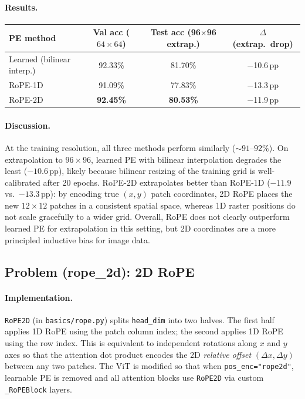 \documentclass[11pt]{article}
\begin{document}
\paragraph{Results.}

\begin{center}
\begin{tabular}{lccc}
\toprule
PE method & Val acc ($64{\times}64$) & Test acc (96$\times$96 extrap.) & $\Delta$ (extrap.\ drop) \\
\midrule
Learned (bilinear interp.) & 92.33\% & 81.70\% & $-$10.6\,pp \\
RoPE-1D                    & 91.09\% & 77.83\% & $-$13.3\,pp \\
RoPE-2D                    & \textbf{92.45\%} & \textbf{80.53\%} & $-$11.9\,pp \\
\bottomrule
\end{tabular}
\end{center}

\paragraph{Discussion.}
At the training resolution, all three methods perform similarly (${\sim}91$--$92\%$). On extrapolation to $96{\times}96$, learned PE with bilinear interpolation degrades the least ($-10.6$\,pp), likely because bilinear resizing of the training grid is well-calibrated after 20 epochs. RoPE-2D extrapolates better than RoPE-1D ($-11.9$ vs.\ $-13.3$\,pp): by encoding true $(x,y)$ patch coordinates, 2D RoPE places the new $12{\times}12$ patches in a consistent spatial space, whereas 1D raster positions do not scale gracefully to a wider grid. Overall, RoPE does not clearly outperform learned PE for extrapolation in this setting, but 2D coordinates are a more principled inductive bias for image data.

\subsection*{Problem (rope\_2d): 2D RoPE}

\paragraph{Implementation.}
\texttt{RoPE2D} (in \texttt{basics/rope.py}) splits \texttt{head\_dim} into two halves. The first half applies 1D RoPE using the patch column index; the second applies 1D RoPE using the row index. This is equivalent to independent rotations along $x$ and $y$ axes so that the attention dot product encodes the 2D \emph{relative offset} $(\Delta x, \Delta y)$ between any two patches. The ViT is modified so that when \texttt{pos\_enc="rope2d"}, learnable PE is removed and all attention blocks use \texttt{RoPE2D} via custom \texttt{\_RoPEBlock} layers.
\end{document}
